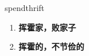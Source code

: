
\begin{frame}
{\huge spendthrift}
\begin{center}
\begin{enumerate}\Large
  \item \textbf{挥霍家，败家子}
  \item \textbf{挥霍的，不节俭的}
\end{enumerate}
\end{center}
\end{frame}
